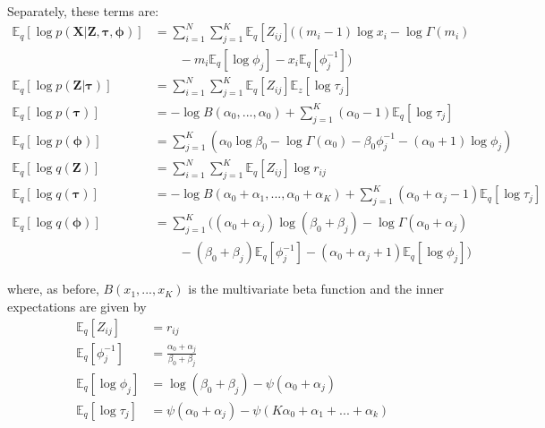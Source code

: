 \documentclass{article}
\let\vec\boldsymbol
\begin{document}
Separately, these terms are:
\begin{align*}
    \mathbb{E}_{q} \left[ \log p \left( \vec{X} | \vec{Z}, \boldsymbol{\tau}, \boldsymbol{\phi} \right) \right] &= \sum\limits_{i=1}^{N} \sum\limits_{j=1}^{K} \mathbb{E}_{q} \left[ Z_{ij} \right] \Big(
        (m_{i} - 1) \log x_{i} - \log \Gamma (m_{i}) \\
    &\qquad - m_{i} \mathbb{E}_{q} \left[ \log \phi_{j} \right] - x_{i} \mathbb{E}_{q} \left[ \phi_{j}^{-1} \right] \Big) \\
    \mathbb{E}_{q} \left[ \log p \left( \vec{Z} | \boldsymbol{\tau} \right) \right] &= \sum\limits_{i=1}^{N} \sum\limits_{j=1}^{K} \mathbb{E}_{q} \left[ Z_{ij} \right] \mathbb{E}_{z} \left[ \log \tau_{j} \right] \\
    \mathbb{E}_{q} \left[ \log p \left( \boldsymbol{\tau} \right) \right] &= - \log B (\alpha_{0}, ..., \alpha_{0}) + \sum\limits_{j=1}^{K} (\alpha_{0} - 1) \mathbb{E}_{q} \left[ \log \tau_{j} \right] \\
    \mathbb{E}_{q} \left[ \log p \left( \boldsymbol{\phi} \right) \right] &= \sum\limits_{j=1}^{K} \left(
        \alpha_{0} \log \beta_{0} - \log \Gamma (\alpha_{0}) - \beta_{0} \phi_{j}^{-1} - (\alpha_{0} + 1) \log \phi_{j}
    \right) \\
    \mathbb{E}_{q} \left[ \log q \left( \vec{Z} \right) \right] &= \sum\limits_{i=1}^{N} \sum\limits_{j=1}^{K} \mathbb{E}_{q} \left[ Z_{ij} \right] \log r_{ij} \\
    \mathbb{E}_{q} \left[ \log q \left( \boldsymbol{\tau} \right) \right] &= - \log B (\alpha_{0} + \alpha_{1}, ..., \alpha_{0} + \alpha_{K} ) + \sum\limits_{j=1}^{K} (\alpha_{0} + \alpha_{j} - 1) \mathbb{E}_{q} \left[ \log \tau_{j} \right] \\
    \mathbb{E}_{q} \left[ \log q \left( \boldsymbol{\phi} \right) \right] &= \sum\limits_{j=1}^{K} \Big(
        (\alpha_{0} + \alpha_{j}) \log (\beta_{0} + \beta_{j}) - \log \Gamma (\alpha_{0} + \alpha_{j}) \\
    &\qquad - (\beta_{0} + \beta_{j}) \mathbb{E}_{q} \left[ \phi_{j}^{-1} \right] - (\alpha_{0} + \alpha_{j} + 1) \mathbb{E}_{q} \left[ \log \phi_{j} \right] 
    \Big)
\end{align*}

where, as before, $B(x_{1}, ..., x_{K})$ is the multivariate beta function and the inner expectations are given by
\begin{align*}
    \mathbb{E}_{q} \left[ Z_{ij} \right] &= r_{ij} \\
    \mathbb{E}_{q} \left[ \phi_{j}^{-1} \right] &= \frac{\alpha_{0} + \alpha_{j}}{\beta_{0} + \beta_{j}} \\
    \mathbb{E}_{q} \left[ \log \phi_{j} \right] &= \log (\beta_{0} + \beta_{j}) - \psi (\alpha_{0} + \alpha_{j}) \\
    \mathbb{E}_{q} \left[ \log \tau_{j} \right] &= \psi (\alpha_{0} + \alpha_{j}) - \psi (K \alpha_{0} + \alpha_{1} + ... + \alpha_{k} )
\end{align*}
\end{document}
